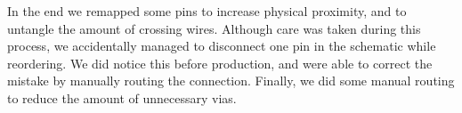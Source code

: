 In the end we remapped some pins to increase physical proximity, and to untangle the amount of crossing wires. Although care was taken during this process, we accidentally managed to disconnect one pin in the schematic while reordering. We did notice this before production, and were able to correct the mistake by manually routing the connection. Finally, we did some manual routing to reduce the amount of unnecessary vias.  

